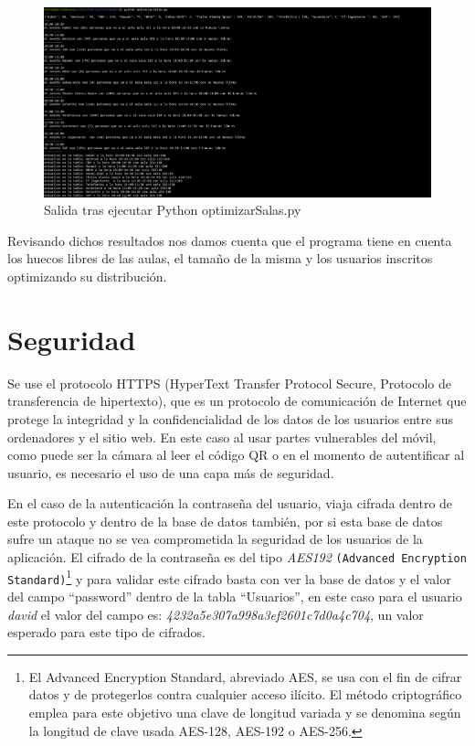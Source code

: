 \documentclass[a4paper, 12pt]{book}
\begin{document}
 \begin{figure}[h!]
  	\centering
  	\includegraphics[width=16cm, keepaspectratio]{img/terminalOptimizar.png}
  	\caption{Salida tras ejecutar Python optimizarSalas.py}\label{fig:terminalOptimizar}
	\end{figure}
 
Revisando dichos resultados nos damos cuenta que el programa tiene en cuenta los huecos libres de las aulas, el tamaño de la misma y los usuarios inscritos optimizando su distribución.


\section{Seguridad}
Se use el protocolo HTTPS (HyperText Transfer Protocol Secure, Protocolo de transferencia de hipertexto), que es un protocolo de comunicación de Internet que protege la integridad y la confidencialidad de los datos de los usuarios entre sus ordenadores y el sitio web. En este caso al usar partes vulnerables del móvil, como puede ser la cámara al leer el código QR o en el momento de autentificar al usuario, es necesario el uso de una capa más de seguridad.
 
 
En el caso de la autenticación la contraseña del usuario, viaja cifrada dentro de este protocolo y dentro de la base de datos también, por si esta base de datos sufre un ataque no se vea comprometida la seguridad de los usuarios de la aplicación.
El cifrado de la contraseña es del tipo \textit{AES192} \texttt{(Advanced Encryption Standard)}\footnote{El Advanced Encryption Standard, abreviado AES, se usa con el fin de cifrar datos y de protegerlos contra cualquier acceso ilícito. El método criptográfico emplea para este objetivo una clave de longitud variada y se denomina según la longitud de clave usada AES-128, AES-192 o AES-256.} y para validar este cifrado basta con ver la base de datos y el valor del campo ``password'' dentro de la tabla ``Usuarios'', en este caso para el usuario \textit{david} el valor del campo es: \textit{4232a5e307a998a3ef2601c7d0a4c704}, un valor esperado para este tipo de cifrados.
\end{document}
